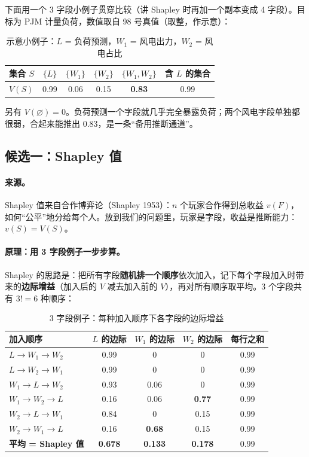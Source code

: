 \documentclass[zihao=-4,a4paper]{ctexart}
\begin{document}
下面用一个 3 字段小例子贯穿比较（讲 Shapley 时再加一个副本变成 4 字段）。目标为 PJM 计量负荷，数值取自 98 号真值（取整，作示意）：

\begin{table}[H]\centering
\caption{示意小例子：$L$ = 负荷预测，$W_1$ = 风电出力，$W_2$ = 风电占比}
\begin{tabular}{lccccc}
\toprule
集合 $S$ & $\{L\}$ & $\{W_1\}$ & $\{W_2\}$ & $\{W_1,W_2\}$ & 含 $L$ 的集合 \\
\midrule
$V(S)$ & 0.99 & 0.06 & 0.15 & \textbf{0.83} & 0.99 \\
\bottomrule
\end{tabular}
\end{table}

另有 $V(\varnothing)=0$。负荷预测一个字段就几乎完全暴露负荷；两个风电字段单独都很弱，合起来能推出 0.83，是一条“备用推断通道”。

\subsection{候选一：Shapley 值}

\paragraph{来源。}Shapley 值来自合作博弈论（Shapley 1953）\cite{shapley1953}：$n$ 个玩家合作得到总收益 $v(F)$，如何“公平”地分给每个人。放到我们的问题里，玩家是字段，收益是推断能力：$v(S)=V(S)$。

\paragraph{原理：用 3 字段例子一步步算。}Shapley 的思路是：把所有字段\textbf{随机排一个顺序}依次加入，记下每个字段加入时带来的\textbf{边际增益}（加入后的 $V$ 减去加入前的 $V$），再对所有顺序取平均。3 个字段共有 $3!=6$ 种顺序：

\begin{table}[H]\centering
\caption{3 字段例子：每种加入顺序下各字段的边际增益}
\begin{tabular}{lcccc}
\toprule
加入顺序 & $L$ 的边际 & $W_1$ 的边际 & $W_2$ 的边际 & 每行之和 \\
\midrule
$L\to W_1\to W_2$ & 0.99 & 0 & 0 & 0.99 \\
$L\to W_2\to W_1$ & 0.99 & 0 & 0 & 0.99 \\
$W_1\to L\to W_2$ & 0.93 & 0.06 & 0 & 0.99 \\
$W_1\to W_2\to L$ & 0.16 & 0.06 & \textbf{0.77} & 0.99 \\
$W_2\to L\to W_1$ & 0.84 & 0 & 0.15 & 0.99 \\
$W_2\to W_1\to L$ & 0.16 & \textbf{0.68} & 0.15 & 0.99 \\
\midrule
\textbf{平均 = Shapley 值} & \textbf{0.678} & \textbf{0.133} & \textbf{0.178} & 0.99 \\
\bottomrule
\end{tabular}
\end{table}
\end{document}
